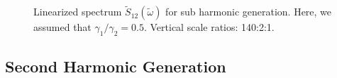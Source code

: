 \documentclass[fleqn,11pt]{wlscirep}
\begin{document}
\begin{figure}[!t]
	\centering
	\caption{Linearized spectrum $\tilde{S}_{12}(\tilde{\omega})$ for sub harmonic generation. Here, we assumed that $\gamma_1/\gamma_2 = 0.5$. Vertical scale ratios: 140:2:1.}
	\label{fig_2}
\end{figure}

\subsection*{Second Harmonic Generation}
\end{document}
